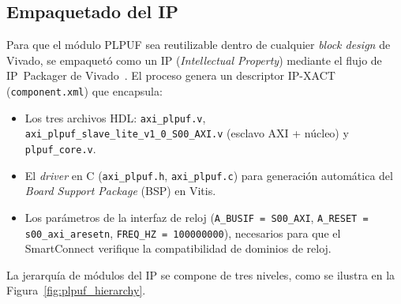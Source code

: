 \subsection{Empaquetado del IP}
\label{sec:ip_packager}

Para que el módulo PLPUF sea reutilizable dentro de cualquier \textit{block
design} de Vivado, se empaquetó como un IP (\textit{Intellectual Property})
mediante el flujo de IP~Packager de Vivado~\cite{ug1037}. El proceso genera
un descriptor IP-XACT (\texttt{component.xml}) que encapsula:

\begin{itemize}
  \item Los tres archivos HDL: \texttt{axi\_plpuf.v}, \texttt{axi\_plpuf\_slave\_lite\_v1\_0\_S00\_AXI.v}
    (esclavo AXI + núcleo) y \texttt{plpuf\_core.v}.
  \item El \textit{driver} en C (\texttt{axi\_plpuf.h}, \texttt{axi\_plpuf.c})
    para generación automática del \textit{Board Support Package} (BSP) en Vitis.
  \item Los parámetros de la interfaz de reloj
    (\texttt{A\_BUSIF\,=\,S00\_AXI},
    \texttt{A\_RESET\,=\,s00\_axi\_aresetn},
    \texttt{FREQ\_HZ\,=\,100000000}), necesarios para que el SmartConnect
    verifique la compatibilidad de dominios de reloj.
\end{itemize}

La jerarquía de módulos del IP se compone de tres niveles, como se ilustra
en la Figura~\ref{fig:plpuf_hierarchy}.


